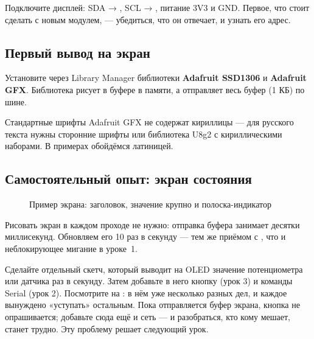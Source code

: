 Подключите дисплей: SDA → , SCL → , питание 3V3 и GND. Первое, что стоит сделать с новым
модулем, --- убедиться, что он отвечает, и узнать его адрес.


\subsection{Первый вывод на экран}

Установите через \textsf{Library Manager} библиотеки \textbf{Adafruit SSD1306} и \textbf{Adafruit GFX}.
Библиотека рисует в буфере в памяти, а  отправляет весь буфер (1 КБ) по шине.


\begin{tip}
Стандартные шрифты Adafruit GFX не содержат кириллицы --- для русского текста нужны сторонние шрифты
или библиотека U8g2 с кириллическими наборами. В примерах обойдёмся латиницей.
\end{tip}

\subsection{Самостоятельный опыт: экран состояния}

\begin{figure}[H]
\centering
{}
\caption{Пример экрана: заголовок, значение крупно и полоска-индикатор}
\end{figure}

Рисовать экран в каждом проходе  не нужно: отправка буфера занимает десятки
миллисекунд. Обновляем его 10 раз в секунду --- тем же приёмом с , что и неблокирующее мигание в уроке~1.

Сделайте отдельный скетч, который выводит на OLED значение потенциометра или датчика раз в секунду.
Затем добавьте в него кнопку (урок 3) и команды Serial (урок 2). Посмотрите на :
в нём уже несколько разных дел,
и каждое вынуждено «уступать» остальным. Пока отправляется буфер экрана, кнопка не опрашивается;
добавьте сюда ещё и сеть --- и разобраться, кто кому мешает, станет трудно. Эту проблему решает следующий урок.

